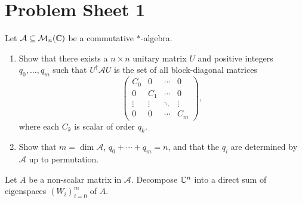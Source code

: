 \documentclass{article}
\begin{document}
\thispagestyle{empty}

\titleBC
\tableofcontents
\clearpage


\section{Problem Sheet 1}

	\begin{problem}
		Let $\mathcal{A} \subseteq \mathcal{M}_n(\mathbb{C})$ be a commutative $*$-algebra.
		\begin{enumerate}[label=(\roman*)]
			\item Show that there exists a $n \times n$ unitary matrix $U$ and positive integers $q_0,\ldots,q_m$ such that $U^\dagger \mathcal{A} U$ is the set of all block-diagonal matrices
			\[ \begin{pmatrix} C_0 & 0 & \cdots & 0 \\ 0 & C_1 & \cdots & 0 \\ \vdots & \vdots & \ddots & \vdots \\ 0 & 0 & \cdots & C_m \end{pmatrix}, \]
			where each $C_k$ is scalar of order $q_k$.
			\item Show that $m = \dim \mathcal{A}$, $q_0 + \cdots + q_m = n$, and that the $q_i$ are determined by $\mathcal{A}$ up to permutation.
		\end{enumerate}
	\end{problem}

	\begin{solution*}
		Let $A$ be a non-scalar matrix in $\mathcal{A}$. Decompose $\mathbb{C}^n$ into a direct sum of eigenspaces $(W_i)_{i=0}^m$ of $A$.
	\end{solution*}
\end{document}

